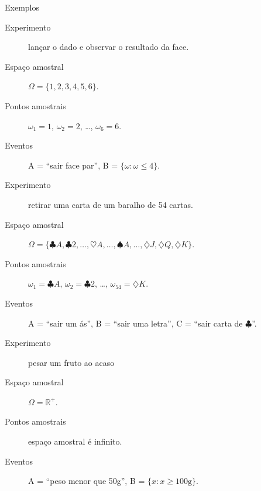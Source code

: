 \documentclass[10pt]{beamer}\usepackage[]{graphicx}\usepackage[]{color}
\theoremstyle{definition}
\begin{document}
\begin{frame}{Exemplos}
  \begin{block}{}
    \begin{description}
    \item[Experimento] lançar o dado e observar o resultado da
      face.
    \item[Espaço amostral] $\Omega=\{1,2,3,4,5,6\}$.
    \item[Pontos amostrais] $\omega_1=\text{1}$, $\omega_2=\text{2}$,
      \ldots, $\omega_6=\text{6}$.
    \item[Eventos] A = ``sair face par'', B = $\{\omega: \omega\leq
      4\}$.
    \end{description}
  \end{block}
  \begin{block}{}
    \begin{description}
    \item[Experimento] retirar uma carta de um baralho de 54
      cartas.
    \item[Espaço amostral] $\Omega=\{\clubsuit A,\clubsuit
      2,\ldots,\heartsuit A,\ldots,\spadesuit A, \ldots,\diamondsuit J,
      \diamondsuit Q, \diamondsuit K\}$.
    \item[Pontos amostrais] $\omega_1=\clubsuit A$, $\omega_2=\clubsuit
      2$, \ldots, $\omega_{54}=\diamondsuit K$.
    \item[Eventos] A = ``sair um ás'', B = ``sair uma letra'', C =
      ``sair carta de $\clubsuit$''.
    \end{description}
  \end{block}
  \begin{block}{}
    \begin{description}
    \item[Experimento] pesar um fruto ao acaso
    \item[Espaço amostral] $\Omega=\mathbb{R}^{+}$.
    \item[Pontos amostrais] espaço amostral é infinito.
    \item[Eventos] A = ``peso menor que 50g'', B = $\{x: x\geq100\text{g}\}$.
    \end{description}
  \end{block}
  \normalsize
\end{frame}
\end{document}
